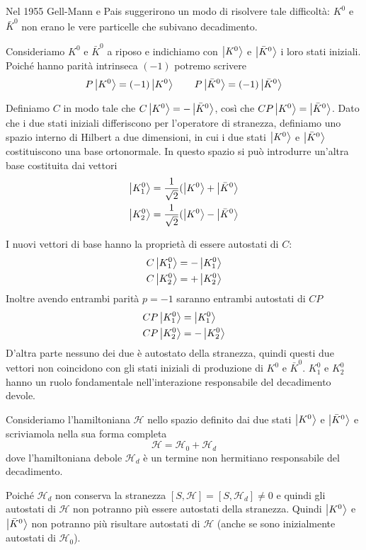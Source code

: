 Nel 1955 Gell-Mann e Pais suggerirono un modo di risolvere tale difficoltà:
$K^0$ e $\bar{K}^0$ non erano le vere particelle che subivano decadimento.

Consideriamo $K^0$ e $\bar{K}^0$ a riposo e indichiamo con $\Ket{K^0}$ e
$\Ket{\bar{K}^0}$ i loro stati iniziali. Poich\'e hanno parità intrinseca $(-1)$
potremo scrivere
\[
  P\Ket{K^0} = (-1)\Ket{K^0}\qquad P\Ket{\bar{K}^0} = (-1)\Ket{\bar{K}^0}
\]

Definiamo $C$ in modo tale che $C\Ket{K^0} = - \Ket{\bar{K}^0}$, così che
$CP\Ket{K^0} = \Ket{\bar{K}^0}$. Dato che i due stati iniziali differiscono per
l'operatore di stranezza, definiamo uno spazio interno di Hilbert a due
dimensioni, in cui i due stati $\Ket{K^0}$ e $\Ket{\bar{K}^0}$ costituiscono una
base ortonormale. In questo spazio si può introdurre un'altra base costituita
dai vettori
\begin{align}
  \Ket{K_1^0} &= \frac{1}{\sqrt{2}}(\Ket{K^0} + \Ket{\bar{K}^0}\\
  \Ket{K_2^0} &= \frac{1}{\sqrt{2}}(\Ket{K^0} - \Ket{\bar{K}^0}
\end{align}

I nuovi vettori di base hanno la proprietà di essere autostati di $C$:
\begin{align*}
  C\Ket{K_1^0} &= -\Ket{K_1^0}\\
  C\Ket{K_2^0} &= +\Ket{K_2^0}
\end{align*}
Inoltre avendo entrambi parità $p=-1$ saranno entrambi autostati di $CP$
\begin{align*}
  CP\Ket{K_1^0} &= \Ket{K_1^0}\\
  CP\Ket{K_2^0} &= -\Ket{K_2^0}
\end{align*}
D'altra parte nessuno dei due è autostato della stranezza, quindi questi due
vettori non coincidono con gli stati iniziali di produzione di $K^0$ e
$\bar{K}^0$. $K_1^0$ e $K_2^0$ hanno un ruolo fondamentale nell'interazione
responsabile del decadimento devole.

\breaknote

Consideriamo l'hamiltoniana $\mathcal{H}$ nello spazio definito dai due stati
$\Ket{K^0}$ e $\Ket{\bar{K}^0}$ e scriviamola nella sua forma completa
\[
  \mathcal{H} = \mathcal{H}_0 + \mathcal{H}_d
\]
dove l'hamiltoniana debole $\mathcal{H}_d$ è un termine non hermitiano
responsabile del decadimento.

Poich\'e $\mathcal{H}_d$ non conserva la stranezza $[S,\mathcal{H}] =
[S,\mathcal{H}_d] \neq 0$ e quindi gli autostati di $\mathcal{H}$ non potranno
più essere autostati della stranezza.
Quindi $\Ket{K^0}$ e $\Ket{\bar{K}^0}$ non potranno più risultare autostati di
$\mathcal{H}$ (anche se sono inizialmente autostati di $\mathcal{H}_0$).

